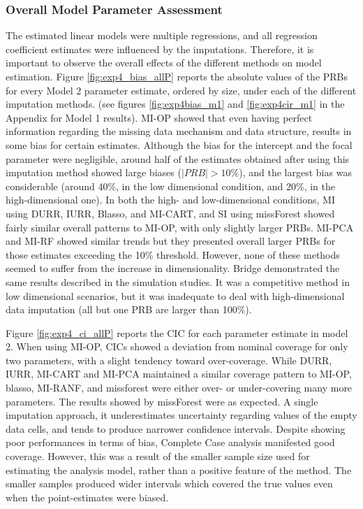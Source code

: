 \FloatBarrier

	\subsubsection{Overall Model Parameter Assessment}
	The estimated linear models were multiple regressions, and all regression coefficient estimates were 
	influenced by the imputations.
	Therefore, it is important to observe the overall effects of the different methods on model estimation.
	Figure \ref{fig:exp4_bias_allP} reports the absolute values of the PRBs for every Model 2 parameter 
	estimate, ordered by size, under each of the different imputation methods.
	(see figures \ref{fig:exp4bias_m1} and \ref{fig:exp4cir_m1} in the Appendix for Model 1 results).
	MI-OP showed that even having perfect information regarding the missing data mechanism and data structure,
	results in some bias for certain estimates.
	Although the bias for the intercept and the focal parameter were negligible, around half of the estimates 
	obtained after using this imputation method showed large biases ($|PRB|>10\%$), and the largest bias was 
	considerable (around 40\%, in the low dimensional condition, and 20\%, in the high-dimensional one).
	In both the high- and low-dimensional conditions, MI using DURR, IURR, Blasso, and MI-CART, and SI using 
	missForest showed fairly similar overall patterns to MI-OP, with only slightly larger PRBs.
	MI-PCA and MI-RF showed similar trends but they presented overall larger PRBs for those estimates 
	exceeding the 10\% threshold.
	However, none of these methods seemed to suffer from the increase in dimensionality.
	Bridge demonstrated the same results described in the simulation studies. 
	It was a competitive method in low dimensional scenarios, but it was inadequate to deal with high-dimensional 
	data imputation (all but one PRB are larger than 100\%).

	Figure \ref{fig:exp4_ci_allP} reports the CIC for each parameter estimate in model 2.
	When using MI-OP, CICs showed a deviation from nominal coverage for only two parameters, with a slight 
	tendency toward over-coverage.
	While DURR, IURR, MI-CART and MI-PCA maintained a similar coverage pattern to MI-OP, 
	blasso, MI-RANF, and missforest were either over- or under-covering many more parameters.
	The results showed by missForest were as expected. 
	A single imputation approach, it underestimates uncertainty regarding values of the empty data cells, 
	and tends to produce narrower confidence intervals.
	Despite showing poor performances in terms of bias, Complete Case analysis manifested good 
	coverage.
	However, this was a result of the smaller sample size used for estimating the analysis model, rather than 
	a positive feature of the method.
	The smaller samples produced wider intervals which covered the true values even when the point-estimates 
	were biased.

